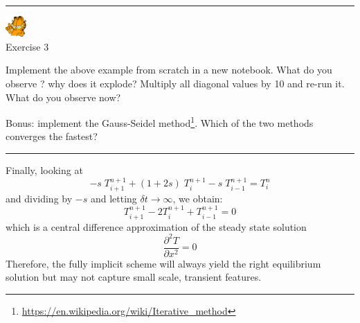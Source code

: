 \begin{center}
\begin{minipage}[t]{0.77\textwidth}
\par\noindent\rule{\textwidth}{0.4pt}

\begin{center}
\includegraphics[width=0.8cm]{images/garftr} \\
{\color{orange}Exercise 3}
\end{center}

Implement the above example from scratch in a new notebook.
What do you observe ? why does it explode? 
Multiply all diagonal values by 10 and re-run it. 
What do you observe now? 


Bonus: implement the Gauss-Seidel method\footnote{
\url{https://en.wikipedia.org/wiki/Iterative_method}}. 
Which of the two methods converges the fastest?
\par\noindent\rule{\textwidth}{0.4pt}
\end{minipage}
\end{center}


\noindent
Finally, looking at
\begin{equation}
-s\;  T_{i+1}^{n+1} + (1+2s)\;  T_{i}^{n+1} - s\;  T_{i-1}^{n+1} = T_i^{n}
\end{equation}
and dividing by $-s$ and letting $\delta t \rightarrow \infty$, we obtain:
\begin{equation}
T_{i+1}^{n+1} -2 T_{i}^{n+1} + T_{i-1}^{n+1} = 0
\end{equation}
which is a central difference approximation of the steady state solution
\begin{equation}
\frac{\partial^2 T }{\partial x^2}=0
\end{equation}
Therefore, the fully implicit scheme will always yield the right equilibrium solution 
but may not capture small scale, transient features.


